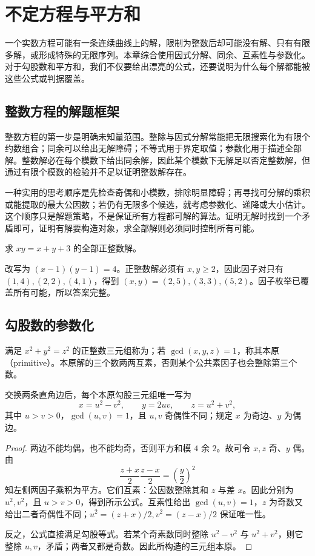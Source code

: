 \documentclass[UTF8,12pt,a4paper,fontset=fandol]{ctexbook}
\begin{document}
\chapter{不定方程与平方和}
\label{ch:diophantine}

一个实数方程可能有一条连续曲线上的解，限制为整数后却可能没有解、只有有限多解，或形成特殊的无限序列。本章综合使用因式分解、同余、互素性与参数化。对于勾股数和平方和，我们不仅要给出漂亮的公式，还要说明为什么每个解都能被这些公式或判据覆盖。

\section{整数方程的解题框架}

整数方程的第一步是明确未知量范围。整除与因式分解常能把无限搜索化为有限个约数组合；同余可以给出无解障碍；不等式用于界定取值；参数化用于描述全部解。整数解必在每个模数下给出同余解，因此某个模数下无解足以否定整数解，但通过有限个模数的检验并不足以证明整数解存在。

一种实用的思考顺序是先检查奇偶和小模数，排除明显障碍；再寻找可分解的乘积或能提取的最大公因数；若仍有无限多个候选，就考虑参数化、递降或大小估计。这个顺序只是解题策略，不是保证所有方程都可解的算法。证明无解时找到一个矛盾即可，证明有解要构造对象，求全部解则必须同时控制所有可能。

\begin{example}
求 $xy=x+y+3$ 的全部正整数解。
\end{example}
\begin{solve}
改写为 $(x-1)(y-1)=4$。正整数解必须有 $x,y\ge2$，因此因子对只有 $(1,4),(2,2),(4,1)$，得到 $(x,y)=(2,5),(3,3),(5,2)$。因子枚举已覆盖所有可能，所以答案完整。
\end{solve}

\section{勾股数的参数化}

满足 $x^2+y^2=z^2$ 的正整数三元组称为；若 $\gcd(x,y,z)=1$，称其本原（primitive）。本原解的三个数两两互素，否则某个公共素因子也会整除第三个数。

\begin{theorem}
\label{thm:pythagorean}
交换两条直角边后，每个本原勾股三元组唯一写为
\begin{equation}
 x=u^2-v^2,\qquad y=2uv,\qquad z=u^2+v^2,
 \label{eq:pythagorean-parameters}
\end{equation}
其中 $u>v>0$，$\gcd(u,v)=1$，且 $u,v$ 奇偶性不同；规定 $x$ 为奇边、$y$ 为偶边。
\end{theorem}
\begin{proof}
两边不能均偶，也不能均奇，否则平方和模 $4$ 余 $2$。故可令 $x,z$ 奇、$y$ 偶。由
\[
 \frac{z+x}{2}\frac{z-x}{2}=\left(\frac y2\right)^2
\]
知左侧两因子乘积为平方。它们互素：公因数整除其和 $z$ 与差 $x$。因此分别为 $u^2,v^2$，且 $u>v>0$，得到所示公式。互素性给出 $\gcd(u,v)=1$，$z$ 为奇数又给出二者奇偶性不同；$u^2=(z+x)/2,v^2=(z-x)/2$ 保证唯一性。

反之，公式直接满足勾股等式。若某个奇素数同时整除 $u^2-v^2$ 与 $u^2+v^2$，则它整除 $u,v$，矛盾；两者又都是奇数。因此所构造的三元组本原。
\end{proof}
\end{document}

